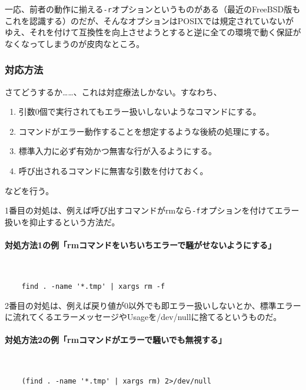 一応、前者の動作に揃える\verb|-r|オプションというものがある（最近のFreeBSD版もこれを認識する）のだが、そんなオプションはPOSIXでは規定されていないがゆえ、それを付けて互換性を向上させようとすると逆に全ての環境で動く保証がなくなってしまうのが皮肉なところ。

\subsubsection*{対応方法}

さてどうするか……、これは対症療法しかない。すなわち、
\begin{enumerate}
  \item 引数0個で実行されてもエラー扱いしないようなコマンドにする。
  \item コマンドがエラー動作することを想定するような後続の処理にする。
  \item 標準入力に必ず有効かつ無害な行が入るようにする。
  \item 呼び出されるコマンドに無害な引数を付けておく。
\end{enumerate}
などを行う。

1番目の対処は、例えば呼び出すコマンドがrmなら\verb|-f|オプションを付けてエラー扱いを抑止するという方法だ。

\paragraph{対処方法1の例「rmコマンドをいちいちエラーで騒がせないようにする」} 　\\
\begin{frameboxit}{160.0mm}
\begin{verbatim}
	find . -name '*.tmp' | xargs rm -f
\end{verbatim}
\end{frameboxit}

2番目の対処は、例えば戻り値が0以外でも即エラー扱いしないとか、標準エラーに流れてくるエラーメッセージやUsageを/dev/nullに捨てるというものだ。

\paragraph{対処方法2の例「rmコマンドがエラーで騒いでも無視する」} 　\\
\begin{frameboxit}{160.0mm}
\begin{verbatim}
	(find . -name '*.tmp' | xargs rm) 2>/dev/null
\end{verbatim}
\end{frameboxit}

